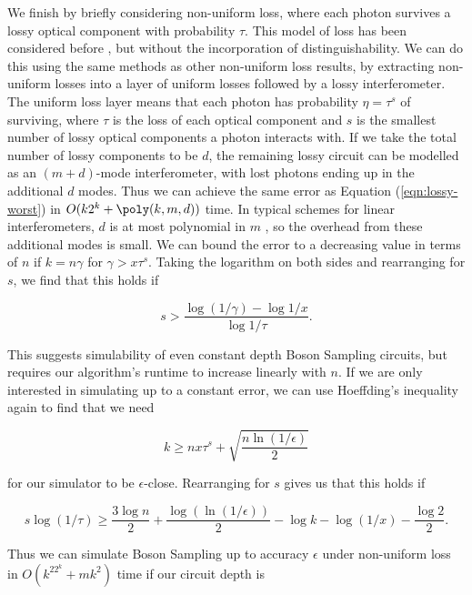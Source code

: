 We finish by briefly considering non-uniform loss, where each photon survives a lossy optical component with probability $\tau$. 
This model of loss has been considered before \cite{garciapatron2017,oszmaniec2018}, but without the incorporation of distinguishability. We can do this using the same methods as other non-uniform loss results, by extracting non-uniform losses into a layer of uniform losses followed by a lossy interferometer. 
The uniform loss layer means that each photon has probability $\eta=\tau^s$ of surviving, where $\tau$ is the loss of each optical component and $s$ is the smallest number of lossy optical components a photon interacts with. 
If we take the total number of lossy components to be $d$, the remaining lossy circuit can be modelled as an $(m+d)$-mode interferometer, with lost photons ending up in the additional $d$ modes. 
Thus we can achieve the same error as Equation (\ref{eqn:lossy-worst}) in $O(k2^k+\poly(k,m,d))$ time. 
In typical schemes for linear interferometers, $d$ is at most polynomial in $m$ \cite{reck1994,clements2016}, so the overhead from these additional modes is small. 
We can bound the error to a decreasing value in terms of $n$ if $k=n\gamma$ for $\gamma > x\tau^s$. Taking the logarithm on both sides and rearranging for $s$, we find that this holds if

\begin{equation}
s>\frac{\log (1/\gamma)-\log 1/x}{\log1/\tau}.
\end{equation}

This suggests simulability of even constant depth Boson Sampling circuits, but requires our algorithm's runtime to increase linearly with $n$. If we are only interested in simulating up to a constant error, we can use Hoeffding's inequality again to find that we need

\begin{equation}
k \geq nx\tau^s + \sqrt{\frac{n\ln(1/\epsilon)}{2}}
\end{equation}

\noindent for our simulator to be $\epsilon$-close. Rearranging for $s$ gives us that this holds if

\begin{equation}
s\log(1/\tau) \geq \frac{3\log n}{2} + \frac{\log(\ln(1/\epsilon))}{2} - \log k -\log(1/x) - \frac{\log 2}{2}.
\end{equation}

Thus we can simulate Boson Sampling up to accuracy $\epsilon$ under non-uniform loss in $O(k^22^k+mk^2)$ time if our circuit depth is

